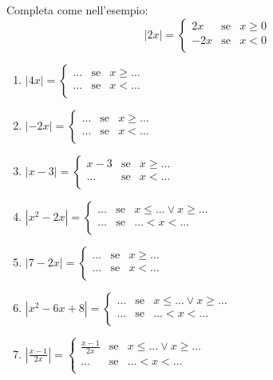 \begin{esercizio}\label{ese:03.1}
Completa come nell'esempio:
$$
|2x|=
        \left\lbrace 
        \begin{array}{lcl}
        2x & \text{se}& x\geq 0\\
        -2x & \text{se}& x< 0\\
        \end{array}
        \right.
$$

\begin{enumerate}
\item 
$
|4x|=
\left\lbrace 
\begin{array}{lcl}
\dots & \text{se}& x\geq\dots\\
\dots & \text{se}& x<\dots\\
\end{array}
\right.
$
\item 
$
|-2x|=
\left\lbrace 
\begin{array}{lcl}
\dots & \text{se}& x\geq\dots\\
\dots & \text{se}& x<\dots\\
\end{array}
\right.
$
\item 
$
|x-3|=
\left\lbrace 
\begin{array}{lcl}
x-3 & \text{se}& x\geq\dots\\
\dots & \text{se}& x<\dots\\
\end{array}
\right.
$
\item 
$
|x^2-2x|=
\left\lbrace 
\begin{array}{lcl}
\dots & \text{se}& x\leq\dots \vee x\geq\dots\\
\dots & \text{se}& \dots <x<\dots\\
\end{array}
\right.
$
\item 
$
|7-2x|=
\left\lbrace 
\begin{array}{lcl}
\dots & \text{se}& x\geq\dots\\
\dots & \text{se}& x<\dots\\
\end{array}
\right.
$
\item 
$
|x^2-6x+8|=
\left\lbrace 
\begin{array}{lcl}
\dots & \text{se}& x\leq\dots \vee x\geq\dots\\
\dots & \text{se}& \dots <x<\dots\\
\end{array}
\right.
$
\item 
$
|\frac{x-1}{2x}|=
\left\lbrace 
\begin{array}{lcl}
\frac{x-1}{2x} & \text{se}& x\leq\dots \vee x\geq\dots\\
\dots & \text{se}& \dots <x<\dots\\
\end{array}
\right.
$
\end{enumerate}
\end{esercizio}

